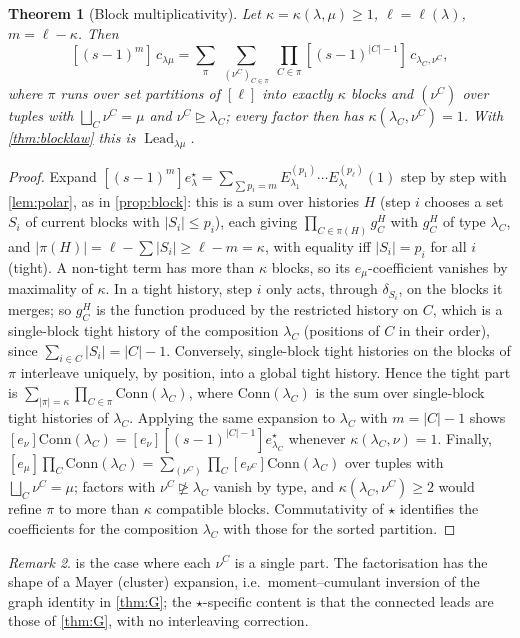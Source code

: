 \documentclass[11pt]{amsart}
\newtheorem{theorem}{Theorem}[section]
\theoremstyle{definition}
\theoremstyle{remark}
\newtheorem{remark}[theorem]{Remark}
\numberwithin{equation}{section}
\newcommand{\Lead}{\operatorname{Lead}}
\begin{document}
\begin{theorem}[Block multiplicativity]\label{thm:blockmult}
Let $\kappa=\kappa(\lambda,\mu)\ge1$, $\ell=\ell(\lambda)$, $m=\ell-\kappa$. Then
\[ [(s-1)^m]\,c_{\lambda\mu}=\sum_{\pi}\ \sum_{(\nu^C)_{C\in\pi}}\ \prod_{C\in\pi}[(s-1)^{|C|-1}]\,c_{\lambda_C,\nu^C}, \]
where $\pi$ runs over set partitions of $[\ell]$ into exactly $\kappa$ blocks and $(\nu^C)$ over tuples with $\bigsqcup_C\nu^C=\mu$ and $\nu^C\trianglerighteq\lambda_C$; every factor then has $\kappa(\lambda_C,\nu^C)=1$. With \cref{thm:blocklaw} this is $\Lead_{\lambda\mu}$.
\end{theorem}
\begin{proof}
Expand $[(s-1)^m]e^\star_\lambda=\sum_{\sum p_i=m}E^{(p_1)}_{\lambda_1}\cdots E^{(p_\ell)}_{\lambda_\ell}(1)$ step by step with \cref{lem:polar}, as in \cref{prop:block}: this is a sum over histories $H$ (step $i$ chooses a set $S_i$ of current blocks with $|S_i|\le p_i$), each giving $\prod_{C\in\pi(H)}g^H_C$ with $g^H_C$ of type $\lambda_C$, and $|\pi(H)|=\ell-\sum|S_i|\ge\ell-m=\kappa$, with equality iff $|S_i|=p_i$ for all $i$ (tight). A non-tight term has more than $\kappa$ blocks, so its $e_\mu$-coefficient vanishes by maximality of $\kappa$. In a tight history, step $i$ only acts, through $\delta_{S_i}$, on the blocks it merges; so $g^H_C$ is the function produced by the restricted history on $C$, which is a single-block tight history of the composition $\lambda_C$ (positions of $C$ in their order), since $\sum_{i\in C}|S_i|=|C|-1$. Conversely, single-block tight histories on the blocks of $\pi$ interleave uniquely, by position, into a global tight history. Hence the tight part is $\sum_{|\pi|=\kappa}\prod_{C\in\pi}\mathrm{Conn}(\lambda_C)$, where $\mathrm{Conn}(\lambda_C)$ is the sum over single-block tight histories of $\lambda_C$. Applying the same expansion to $\lambda_C$ with $m=|C|-1$ shows $[e_\nu]\mathrm{Conn}(\lambda_C)=[e_\nu][(s-1)^{|C|-1}]e^\star_{\lambda_C}$ whenever $\kappa(\lambda_C,\nu)=1$. Finally, $[e_\mu]\prod_C\mathrm{Conn}(\lambda_C)=\sum_{(\nu^C)}\prod_C[e_{\nu^C}]\mathrm{Conn}(\lambda_C)$ over tuples with $\bigsqcup_C\nu^C=\mu$; factors with $\nu^C\not\trianglerighteq\lambda_C$ vanish by type, and $\kappa(\lambda_C,\nu^C)\ge2$ would refine $\pi$ to more than $\kappa$ compatible blocks. Commutativity of $\star$ \cite{Hikita25} identifies the coefficients for the composition $\lambda_C$ with those for the sorted partition.
\end{proof}
\begin{remark}
 is the case where each $\nu^C$ is a single part. The factorisation has the shape of a Mayer (cluster) expansion, i.e.\ moment--cumulant inversion of the graph identity in \cref{thm:G}; the $\star$-specific content is that the connected leads are those of \cref{thm:G}, with no interleaving correction.
\end{remark}
\end{document}
